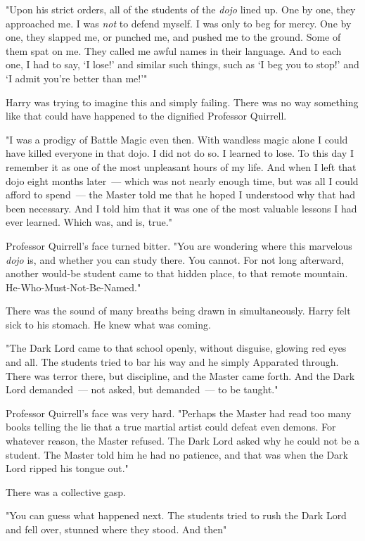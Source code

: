 "Upon his strict orders, all of the students of the \emph{dojo} lined up. One
by one, they approached me. I was \emph{not} to defend myself. I was only to
beg for mercy. One by one, they slapped me, or punched me, and pushed me to the
ground. Some of them spat on me. They called me awful names in their language.
And to each one, I had to say, `I lose!' and similar such things, such as `I
beg you to stop!' and `I admit you're better than me!'"

Harry was trying to imagine this and simply failing. There was no way something
like that could have happened to the dignified Professor Quirrell.

"I was a prodigy of Battle Magic even then. With wandless magic alone I could
have killed everyone in that dojo. I did not do so. I learned to lose. To this
day I remember it as one of the most unpleasant hours of my life. And when I
left that dojo eight months later~--- which was not nearly enough time, but was
all I could afford to spend~--- the Master told me that he hoped I understood why
that had been necessary. And I told him that it was one of the most valuable
lessons I had ever learned. Which was, and is, true."

Professor Quirrell's face turned bitter. "You are wondering where this
marvelous \emph{dojo} is, and whether you can study there. You cannot. For not
long afterward, another would-be student came to that hidden place, to that
remote mountain. He-Who-Must-Not-Be-Named."

There was the sound of many breaths being drawn in simultaneously. Harry felt
sick to his stomach. He knew what was coming.

"The Dark Lord came to that school openly, without disguise, glowing red eyes
and all. The students tried to bar his way and he simply Apparated through.
There was terror there, but discipline, and the Master came forth. And the Dark
Lord demanded~--- not asked, but demanded~--- to be taught."

Professor Quirrell's face was very hard. "Perhaps the Master had read too many
books telling the lie that a true martial artist could defeat even demons. For
whatever reason, the Master refused. The Dark Lord asked why he could not be a
student. The Master told him he had no patience, and that was when the Dark
Lord ripped his tongue out."

There was a collective gasp.

"You can guess what happened next. The students tried to rush the Dark Lord and
fell over, stunned where they stood. And then{\el}"

